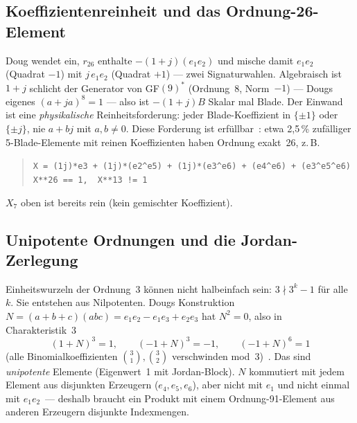\subsection{Koeffizientenreinheit und das Ordnung-26-Element}

Doug wendet ein, $r_{26}$ enthalte $-(1+j)(e_1e_2)$ und mische damit $e_1e_2$
(Quadrat $-1$) mit $j\,e_1e_2$ (Quadrat $+1$) --- zwei Signaturwahlen.
Algebraisch ist $1+j$ schlicht der Generator von GF$(9)^*$ (Ordnung~8, Norm~$-1$) ---
Dougs eigenes $(a+ja)^8=1$ --- also ist $-(1+j)B$ Skalar mal Blade. Der Einwand ist
eine \emph{physikalische} Reinheitsforderung: jeder Blade-Koeffizient in $\{\pm1\}$
oder $\{\pm j\}$, nie $a+bj$ mit $a,b\neq0$. Diese Forderung ist erfüllbar~\BM:
etwa 2,5\,\% zufälliger 5-Blade-Elemente mit reinen Koeffizienten haben Ordnung
exakt~26, z.\,B.
\begin{quote}\small
\texttt{X = (1j)*e3 + (1j)*(e2\^{}e5) + (1j)*(e3\^{}e6) + (e4\^{}e6) + (e3\^{}e5\^{}e6)}\\
\texttt{X**26 == 1,\ \ X**13 != 1}
\end{quote}
$X_7$ oben ist bereits rein (kein gemischter Koeffizient).

\subsection{Unipotente Ordnungen und die Jordan-Zerlegung}

Einheitswurzeln der Ordnung~3 können nicht halbeinfach sein: $3 \nmid 3^k-1$ für
alle $k$. Sie entstehen aus Nilpotenten. Dougs Konstruktion
$N=(a+b+c)(abc)=e_1e_2-e_1e_3+e_2e_3$ hat $N^2=0$, also in Charakteristik~3
\begin{equation}
  (1+N)^3 = 1,\qquad (-1+N)^3=-1,\qquad (-1+N)^6 = 1
\end{equation}
(alle Binomialkoeffizienten $\binom{3}{1},\binom{3}{2}$ verschwinden mod~3)~\BM.
Das sind \emph{unipotente} Elemente (Eigenwert~1 mit Jordan-Block).
$N$ kommutiert mit jedem Element aus disjunkten Erzeugern ($e_4,e_5,e_6$),
aber nicht mit $e_1$ und nicht einmal mit $e_1e_2$~\BM --- deshalb braucht ein Produkt
mit einem Ordnung-91-Element aus anderen Erzeugern disjunkte Indexmengen.

